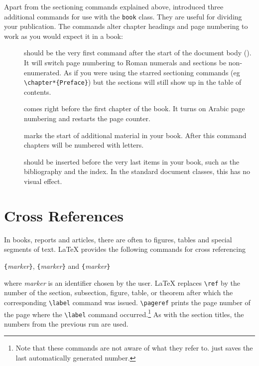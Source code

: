 Apart from the sectioning commands explained above, \LaTeXe{}
introduced three additional commands for use with the \verb|book| class. 
They are useful for dividing your publication. The commands alter
chapter headings and page numbering to work as you would expect it in
a book:
\begin{description}
\item[] should be the very first command after
  the start of the document body (\verb||). It will switch page numbering to Roman
    numerals and sections be non-enumerated. As if you were using 
    the starred sectioning commands (eg \verb|\chapter*{Preface}|)
    but the sections will still show up in the table of contents.
\item[] comes right before the first chapter of
  the book. It turns on Arabic page numbering and restarts the page
  counter.
\item[] marks the start of additional material in your
  book. After this command chapters will be numbered with letters.
\item[] should be inserted before the very last items
  in your book, such as the bibliography and the index. In the standard
  document classes, this has no visual effect.
\end{description}


\section{Cross References}

In books, reports and articles, there are often 
 to figures, tables and special segments of text.
\LaTeX{} provides the following commands for cross referencing
\begin{lscommand}
\verb|{|\emph{marker}\verb|}|, \verb|{|\emph{marker}\verb|}| 
and \verb|{|\emph{marker}\verb|}|
\end{lscommand}
\noindent where \emph{marker} is an identifier chosen by the user. \LaTeX{}
replaces \verb|\ref| by the number of the section, subsection, figure,
table, or theorem after which the corresponding \verb|\label| command
was issued. \verb|\pageref| prints the page number of the
page where the \verb|\label| command occurred.\footnote{Note that these commands
  are not aware of what they refer to.  just saves the last
  automatically generated number.} As with the section titles, the
numbers from the previous run are used.

